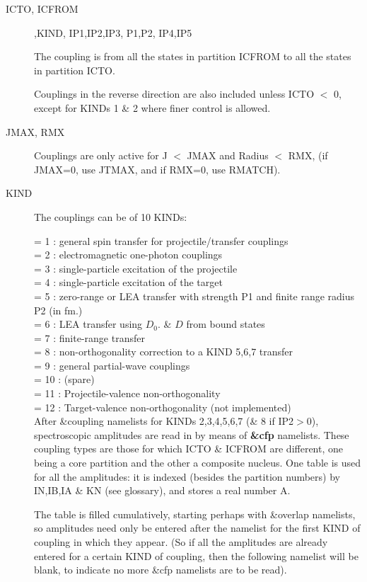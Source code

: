 \documentclass[11pt]{article}
\begin{document}
\begin{description}
\item[ICTO, ICFROM] ,KIND,  IP1,IP2,IP3,  P1,P2,  IP4,IP5

The coupling is from all the states in partition ICFROM
to all the states in partition ICTO.

Couplings in the reverse direction are also included unless
ICTO $<$ 0, except for KINDs 1 \& 2 where finer control is allowed.

\item[JMAX, RMX]
Couplings are only active for J $<$ JMAX and Radius $<$ RMX,
(if JMAX=0, use JTMAX, and if RMX=0, use  RMATCH).

\item[KIND]
The couplings can be of 10 KINDs:

            = 1 : general spin transfer for projectile/transfer couplings\\
            = 2 : electromagnetic one-photon couplings\\
            = 3 : single-particle excitation of the projectile\\
            = 4 : single-particle excitation of the target\\
            = 5 : zero-range or LEA transfer with strength P1 and finite range radius P2 (in fm.)\\
            = 6 : LEA transfer using $D_0$. \& $D$ from bound states\\
            = 7 : finite-range transfer\\
            = 8 : non-orthogonality correction to a KIND 5,6,7 transfer\\
            = 9 : general partial-wave couplings\\
            = 10 : (spare)\\
            = 11 : Projectile-valence non-orthogonality\\
            = 12 : Target-valence non-orthogonality (not implemented)\\

After \&coupling namelists for KINDs 2,3,4,5,6,7 (\& 8 if IP2$>$0),
spectroscopic amplitudes are read in by means of {\bf \&cfp} namelists.
These coupling types are those for which ICTO \& ICFROM are
different, one being a core partition and the other a composite
nucleus. One table is used for all the amplitudes: it is indexed
(besides the partition numbers) by IN,IB,IA \& KN (see glossary),
and stores a real number A.

The table is filled cumulatively,
starting perhaps with \&overlap namelists, 
so amplitudes need only be
entered after the namelist for the first KIND of coupling in which
they appear.
(So if all the amplitudes are already entered for a certain KIND
of coupling, then the following namelist will be blank, to indicate
no more \&cfp namelists are to be read).


\end{description}
\end{document}
